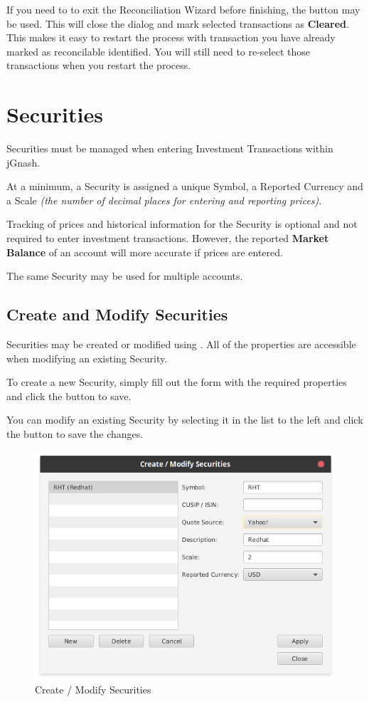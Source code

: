 \documentclass[letterpaper,12pt]{book}
\begin{document}
    If you need to to exit the Reconciliation Wizard before finishing, the  button may be used.
    This will close the dialog and mark selected transactions as \textbf{Cleared}.
    This makes it easy to restart the process with transaction you have already marked as reconcilable identified.
    You will still need to re-select those transactions when you restart the process.

    \chapter{Securities}
    \label{ch:securities}
    Securities must be managed when entering Investment Transactions within jGnash.  
                    
    At a minimum, a Security is assigned a unique Symbol, a Reported Currency and a Scale \textit{(the number of decimal places 
    for entering and reporting prices)}.  

    Tracking of prices and historical information for the Security is optional and not required to enter
    investment transactions.  However, the reported \textbf{Market Balance} of an account will more accurate if prices are entered.
    
    The same Security may be used for multiple accounts.
    
    
    
    \section{Create and Modify Securities}
    
    Securities may be created or modified using .  All of the properties are
    accessible when modifying an existing Security.
    
    To create a new Security, simply fill out the form with the required properties and click the  button to save.
    
    You can modify an existing Security by selecting it in the list to the left and click 
    the  button to save the changes.
    
    \begin{figure}[h]
        \caption{Create / Modify Securities}
        \includegraphics[width=0.6\linewidth]{images/createModifySecurities}
    \end{figure}
\end{document}
